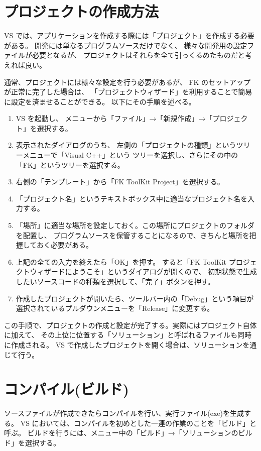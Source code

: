 \documentclass[a4j]{jarticle}
\begin{document}
\section{プロジェクトの作成方法}
VS では、アプリケーションを作成する際には「プロジェクト」を作成する必要がある。
開発には単なるプログラムソースだけでなく、
様々な開発用の設定ファイルが必要となるが、
プロジェクトはそれらを全て引っくるめたものだと考えれば良い。

通常、プロジェクトには様々な設定を行う必要があるが、
FK のセットアップが正常に完了した場合は、
「プロジェクトウィザード」を利用することで簡易に設定を済ませることができる。
以下にその手順を述べる。

\begin{enumerate}
 \item VS を起動し、
	メニューから「ファイル」→「新規作成」→「プロジェクト」を選択する。
 \item 表示されたダイアログのうち、
	左側の「プロジェクトの種類」というツリーメニューで「Visual C++」という
	ツリーを選択し、さらにその中の「FK」というツリーを選択する。
 \item 右側の「テンプレート」から「FK ToolKit Project」を選択する。
 \item 「プロジェクト名」というテキストボックス中に適当なプロジェクト名を入力する。
 \item 「場所」に適当な場所を設定しておく。この場所にプロジェクトのフォルダを配置し、
	プログラムソースを保管することになるので、きちんと場所を把握しておく必要がある。
 \item 上記の全ての入力を終えたら「OK」を押す。
	すると「FK ToolKit プロジェクトウィザードにようこそ」というダイアログが開くので、
	初期状態で生成したいソースコードの種類を選択して、「完了」ボタンを押す。
 \item	作成したプロジェクトが開いたら、ツールバー内の「Debug」という項目が
 	選択されているプルダウンメニューを「Release」に変更する。
\end{enumerate}

この手順で、プロジェクトの作成と設定が完了する。実際にはプロジェクト自体に加えて、
その上位に位置する「ソリューション」と呼ばれるファイルも同時に作成される。
VS で作成したプロジェクトを開く場合は、ソリューションを通じて行う。


\section{コンパイル(ビルド)}
ソースファイルが作成できたらコンパイルを行い、実行ファイル(exe)を生成する。
VS においては、コンパイルを初めとした一連の作業のことを「ビルド」と呼ぶ。
ビルドを行うには、メニュー中の「ビルド」→「ソリューションのビルド」を選択する。
\end{document}
